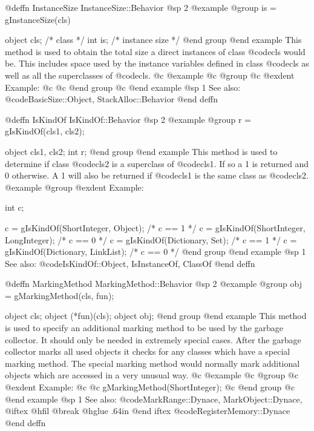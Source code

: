 @deffn {InstanceSize} InstanceSize::Behavior
@sp 2
@example
@group
is = gInstanceSize(cls)

object  cls;    /* class                */
int     is;     /* instance size        */
@end group
@end example
This method is used to obtain the total size a direct instances of class
@code{cls} would be.  This includes space used by the instance variables
defined in class @code{cls} as well as all the superclasses of
@code{cls}.
@c @example
@c @group
@c @exdent Example:
@c 
@c @end group
@c @end example
@sp 1
See also:  @code{BasicSize::Object, StackAlloc::Behavior}
@end deffn










@deffn {IsKindOf} IsKindOf::Behavior
@sp 2
@example
@group
r = gIsKindOf(cls1, cls2);

object  cls1, cls2;
int     r;
@end group
@end example
This method is used to determine if class @code{cls2} is a
superclass of @code{cls1}.  If so a 1 is returned and 0 otherwise.
A 1 will also be returned if @code{cls1} is the same class as @code{cls2}.
@example
@group
@exdent Example:

int     c;

c = gIsKindOf(ShortInteger, Object);      /* c == 1  */
c = gIsKindOf(ShortInteger, LongInteger); /* c == 0  */
c = gIsKindOf(Dictionary, Set);           /* c == 1  */
c = gIsKindOf(Dictionary, LinkList);      /* c == 0  */
@end group
@end example
@sp 1
See also:  @code{IsKindOf::Object, IsInstanceOf, ClassOf}
@end deffn











@deffn {MarkingMethod} MarkingMethod::Behavior
@sp 2
@example
@group
obj = gMarkingMethod(cls, fun);

object  cls;
object  (*fun)(cls);
object  obj;
@end group
@end example
This method is used to specify an additional marking method to be used
by the garbage collector.  It should only be needed in extremely special
cases.  After the garbage collector marks all used objects it checks
for any classes which have a special marking method.  The special
marking method would normally mark additional objects which are accessed
in a very unusual way.
@c @example
@c @group
@c @exdent Example:
@c 
@c gMarkingMethod(ShortInteger);
@c @end group
@c @end example
@sp 1
See also:  @code{MarkRange::Dynace, MarkObject::Dynace,}
@iftex
@hfil @break @hglue .64in    
@end iftex
@code{RegisterMemory::Dynace}
@end deffn








